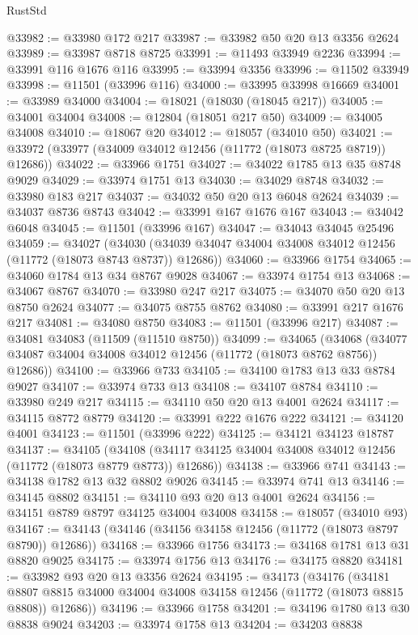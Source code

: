 \begin{lexlean}{RustStd}
\begin{coremodule}
@33982 := @33980 @172 @217
@33987 := @33982 @50 @20 @13 @3356 @2624
@33989 := @33987 @8718 @8725
@33991 := @11493 @33949 @2236
@33994 := @33991 @116 @1676 @116
@33995 := @33994 @3356
@33996 := @11502 @33949
@33998 := @11501 (@33996 @116)
@34000 := @33995 @33998 @16669
@34001 := @33989 @34000
@34004 := @18021 (@18030 (@18045 @217))
@34005 := @34001 @34004
@34008 := @12804 (@18051 @217 @50)
@34009 := @34005 @34008
@34010 := @18067 @20
@34012 := @18057 (@34010 @50)
@34021 := @33972 (@33977 (@34009 @34012 @12456 (@11772 (@18073 @8725 @8719)) @12686))
@34022 := @33966 @1751
@34027 := @34022 @1785 @13 @35 @8748 @9029
@34029 := @33974 @1751 @13
@34030 := @34029 @8748
@34032 := @33980 @183 @217
@34037 := @34032 @50 @20 @13 @6048 @2624
@34039 := @34037 @8736 @8743
@34042 := @33991 @167 @1676 @167
@34043 := @34042 @6048
@34045 := @11501 (@33996 @167)
@34047 := @34043 @34045 @25496
@34059 := @34027
    (@34030 (@34039 @34047 @34004 @34008 @34012 @12456 (@11772 (@18073 @8743 @8737)) @12686))
@34060 := @33966 @1754
@34065 := @34060 @1784 @13 @34 @8767 @9028
@34067 := @33974 @1754 @13
@34068 := @34067 @8767
@34070 := @33980 @247 @217
@34075 := @34070 @50 @20 @13 @8750 @2624
@34077 := @34075 @8755 @8762
@34080 := @33991 @217 @1676 @217
@34081 := @34080 @8750
@34083 := @11501 (@33996 @217)
@34087 := @34081 @34083 (@11509 (@11510 @8750))
@34099 := @34065
    (@34068 (@34077 @34087 @34004 @34008 @34012 @12456 (@11772 (@18073 @8762 @8756)) @12686))
@34100 := @33966 @733
@34105 := @34100 @1783 @13 @33 @8784 @9027
@34107 := @33974 @733 @13
@34108 := @34107 @8784
@34110 := @33980 @249 @217
@34115 := @34110 @50 @20 @13 @4001 @2624
@34117 := @34115 @8772 @8779
@34120 := @33991 @222 @1676 @222
@34121 := @34120 @4001
@34123 := @11501 (@33996 @222)
@34125 := @34121 @34123 @18787
@34137 := @34105
    (@34108 (@34117 @34125 @34004 @34008 @34012 @12456 (@11772 (@18073 @8779 @8773)) @12686))
@34138 := @33966 @741
@34143 := @34138 @1782 @13 @32 @8802 @9026
@34145 := @33974 @741 @13
@34146 := @34145 @8802
@34151 := @34110 @93 @20 @13 @4001 @2624
@34156 := @34151 @8789 @8797 @34125 @34004 @34008
@34158 := @18057 (@34010 @93)
@34167 := @34143 (@34146 (@34156 @34158 @12456 (@11772 (@18073 @8797 @8790)) @12686))
@34168 := @33966 @1756
@34173 := @34168 @1781 @13 @31 @8820 @9025
@34175 := @33974 @1756 @13
@34176 := @34175 @8820
@34181 := @33982 @93 @20 @13 @3356 @2624
@34195 := @34173
    (@34176
      (@34181 @8807 @8815 @34000 @34004 @34008 @34158 @12456 (@11772 (@18073 @8815 @8808)) @12686))
@34196 := @33966 @1758
@34201 := @34196 @1780 @13 @30 @8838 @9024
@34203 := @33974 @1758 @13
@34204 := @34203 @8838

\end{coremodule}
\end{lexlean}
